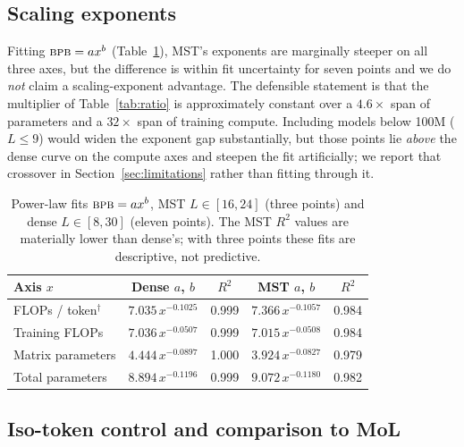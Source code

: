 \documentclass{article}
\newcommand{\bpb}{\textsc{bpb}}
\begin{document}
\subsection{Scaling exponents}

Fitting $\bpb = a x^{b}$ (Table~\ref{tab:fits}), MST's exponents are marginally
steeper on all three axes, but the difference is within fit uncertainty for seven
points and we do \emph{not} claim a scaling-exponent advantage. The defensible
statement is that the multiplier of Table~\ref{tab:ratio} is approximately
constant over a $4.6\times$ span of parameters and a $32\times$ span of training
compute. Including models below 100M ($L\le9$) would widen the exponent gap
substantially, but those points lie \emph{above} the dense curve on the compute
axes and steepen the fit artificially; we report that crossover in
Section~\ref{sec:limitations} rather than fitting through it.

\begin{table}[t]
\caption{Power-law fits $\bpb = a x^{b}$, MST $L\!\in\![16,24]$ (three points) and
dense $L\!\in\![8,30]$ (eleven points). The MST $R^2$ values are materially lower
than dense's; with three points these fits are descriptive, not predictive.}
\label{tab:fits}
\begin{center}
\begin{small}
\begin{tabular}{lcccc}
\toprule
Axis $x$ & Dense $a$, $b$ & $R^2$ & MST $a$, $b$ & $R^2$ \\
\midrule
FLOPs / token$^\dagger$ & $7.035\,x^{-0.1025}$ & 0.999 & $7.366\,x^{-0.1057}$ & 0.984 \\
Training FLOPs   & $7.036\,x^{-0.0507}$ & 0.999 & $7.015\,x^{-0.0508}$ & 0.984 \\
\midrule
Matrix parameters & $4.444\,x^{-0.0897}$ & 1.000 & $3.924\,x^{-0.0827}$ & 0.979 \\
Total parameters & $8.894\,x^{-0.1196}$ & 0.999 & $9.072\,x^{-0.1180}$ & 0.982 \\
\bottomrule
\end{tabular}
\end{small}
\end{center}
\end{table}

\subsection{Iso-token control and comparison to MoL}
\label{sec:isotoken}
\end{document}

